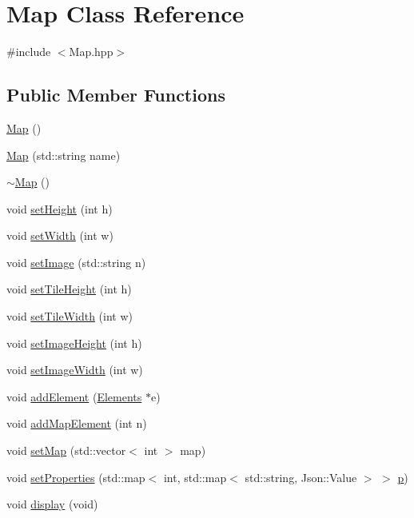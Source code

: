 \hypertarget{class_map}{\section{Map Class Reference}
\label{class_map}
}


{\ttfamily \#include $<$Map.\-hpp$>$}

\subsection*{Public Member Functions}
\begin{DoxyCompactItemize}
\item 
\hyperlink{class_map_a0f5ad0fd4563497b4214038cbca8b582}{Map} ()
\item 
\hyperlink{class_map_aeec3ac95150a6a9df4a417be707bcf9d}{Map} (std\-::string name)
\item 
\hyperlink{class_map_aa403fbe09394ccf39747588f5168e3b2}{$\sim$\-Map} ()
\item 
void \hyperlink{class_map_affab3537641a7985559f83ea083e00ca}{set\-Height} (int h)
\item 
void \hyperlink{class_map_a2915ccde4d8a2ba8142677baea803467}{set\-Width} (int w)
\item 
void \hyperlink{class_map_a7ac17b33fc7266fcc30b19c33c70c3ca}{set\-Image} (std\-::string n)
\item 
void \hyperlink{class_map_a7faf61ea4f43b4c1e15bd3d8744366b6}{set\-Tile\-Height} (int h)
\item 
void \hyperlink{class_map_a88d4cda4b476ae4ee3487786b0feccd9}{set\-Tile\-Width} (int w)
\item 
void \hyperlink{class_map_ada51d21543808fa10d085c3c09bda7f9}{set\-Image\-Height} (int h)
\item 
void \hyperlink{class_map_a38f4a514bf3993ef816b6feda56ab36e}{set\-Image\-Width} (int w)
\item 
void \hyperlink{class_map_a8b3a39287db471b6faec3cfb281b2da6}{add\-Element} (\hyperlink{class_elements}{Elements} $\ast$e)
\item 
void \hyperlink{class_map_a4352368e79238539142cf1397c992c65}{add\-Map\-Element} (int n)
\item 
void \hyperlink{class_map_a6a1130ac8c3c4d6dcf636759aa970b9b}{set\-Map} (std\-::vector$<$ int $>$ map)
\item 
void \hyperlink{class_map_a391c92153c0a6134bec05ae442d4fff0}{set\-Properties} (std\-::map$<$ int, std\-::map$<$ std\-::string, Json\-::\-Value $>$ $>$ \hyperlink{jquery_8js_a2335e57f79b6acfb6de59c235dc8a83e}{p})
\item 
void \hyperlink{class_map_aba8bab272a45054368279643d75fa3ba}{display} (void)
\end{DoxyCompactItemize}



